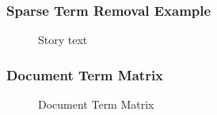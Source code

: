 \documentclass{beamer}
\begin{document}
\begin{frame}[noframenumbering] \label{Sparse Term Removal}
\frametitle{Sparse Term Removal Example}
\begin{figure}[h] 
\centering
{}
\centering
\caption{Story text}
\label{DTM}
\end{figure}
\end{frame}


\begin{frame}[noframenumbering]
\frametitle{Document Term Matrix}
\begin{figure}[h] 
\centering
{}
\centering
\caption{Document Term Matrix}
\label{DTM}
\end{figure}
\end{frame}
\end{document}
